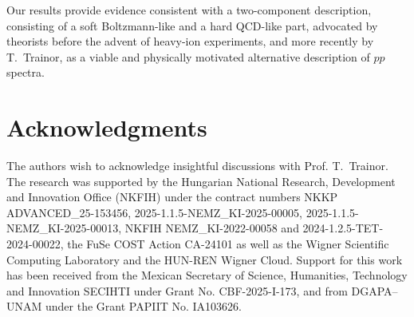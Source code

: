 \documentclass[pdflatex,sn-mathphys-num]{sn-jnl}%
\begin{document}
Our results provide evidence consistent with a two-component description, consisting of a soft Boltzmann-like and a hard QCD-like part, advocated by theorists before the advent of heavy-ion experiments, and more recently by T.~Trainor, as a viable and physically motivated alternative description of $pp$ spectra.


\section*{Acknowledgments}
The authors wish to acknowledge insightful discussions with Prof. T.~Trainor. The research was supported by the Hungarian National Research, Development and Innovation Office (NKFIH) under the contract numbers NKKP ADVANCED\_25-153456, 2025-1.1.5-NEMZ\_KI-2025-00005, 2025-1.1.5-NEMZ\_KI-2025-00013, NKFIH NEMZ\_KI-2022-00058 and 2024-1.2.5-TET-2024-00022, the FuSe COST Action CA-24101 as well as 
the Wigner Scientific Computing Laboratory and the HUN-REN Wigner Cloud. Support for this work has been received from the Mexican Secretary of Science, Humanities, Technology and Innovation SECIHTI under Grant No. CBF-2025-I-173, and from DGAPA--UNAM under the Grant PAPIIT No. IA103626.

 
\end{document}
